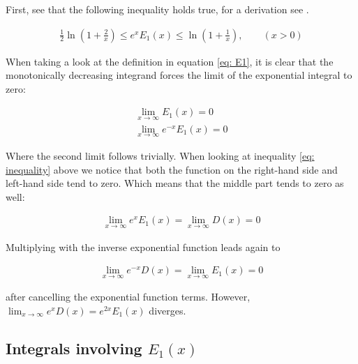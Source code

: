 \documentclass[bibliography=totocnumbered]{scrartcl}
\begin{document}
	First, see that the following inequality holds true, for a derivation see \cite{gautschi}.
	
	\begin{gather}
		\frac{1}{2}\ln\left(1+\frac{2}{x}\right)\leq{}e^xE_1\left(x\right)\leq\ln\left(1+\frac{1}{x}\right)\label{eq: inequality},\qquad\left(x>0\right)
	\end{gather}
	
	When taking a look at the definition in equation \ref{eq: E1}, it is clear that the monotonically decreasing integrand forces the limit of the exponential integral to zero:
	
	\begin{gather}
		\lim_{x\to\infty}E_1\left(x\right)=0\\
		\lim_{x\to\infty}e^{-x}E_1\left(x\right)=0
	\end{gather}
	
	Where the second limit follows trivially. When looking at inequality \eqref{eq: inequality} above we notice that both the function on the right-hand side and left-hand side tend to zero. Which means that the middle part tends to zero as well: 
	
	\begin{gather}
		\lim_{x\to\infty}e^{x}E_1\left(x\right)=\lim_{x\to\infty}D\left(x\right)=0
	\end{gather}
	
	Multiplying with the inverse exponential function leads again to
	
	\begin{gather}
		\lim_{x\to\infty}e^{-x}D\left(x\right)=\lim_{x\to\infty}E_1\left(x\right)=0
	\end{gather}
	
	after cancelling the exponential function terms. However, $\lim_{x\to\infty}e^{x}D\left(x\right)=e^{2x}E_1\left(x\right)$ diverges.

	\subsection[Integrals involving E1(x)]{Integrals involving $E_1\left(x\right)$}
\end{document}
